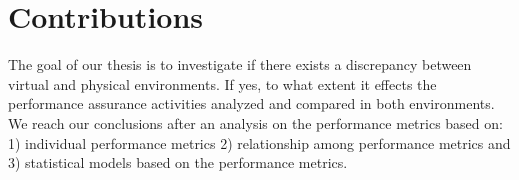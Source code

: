 




\section{Contributions}


The goal of our thesis is to investigate if there exists a discrepancy between virtual and physical environments. If yes, to what extent it effects the performance assurance activities analyzed and compared in both environments. We reach our conclusions after an analysis on the performance metrics based on: 1) individual performance metrics 2) relationship among performance metrics and 3) statistical models based on the performance metrics.

